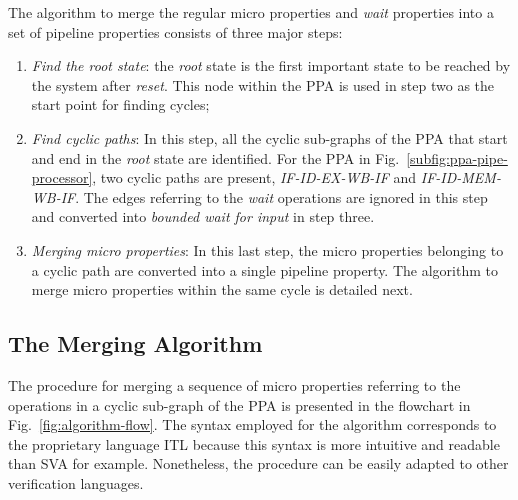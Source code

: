 The algorithm to merge the regular micro properties and \textit{wait} properties into a set of pipeline properties consists of three major steps:

\begin{enumerate}
\item \textit{Find the root state}: the \textit{root} state is the first important state to be reached by the system after \textit{reset}. This node within the PPA is used in step two as the start point for finding cycles;
\item \textit{Find cyclic paths}: In this step, all the cyclic sub-graphs of the PPA that start and end in the \textit{root} state are identified. For the PPA in Fig.~\ref{subfig:ppa-pipe-processor}, two cyclic paths are present, \textit{IF-ID-EX-WB-IF} and \textit{IF-ID-MEM-WB-IF}. The edges referring to the \textit{wait} operations are ignored in this step and converted into \textit{bounded wait for input} in step three.
\item \textit{Merging micro properties}: In this last step, the micro properties belonging to a cyclic path are converted into a single pipeline property. The algorithm to merge micro properties within the same cycle is detailed next. 
\end{enumerate}

\subsection*{The Merging Algorithm}

The procedure for merging a sequence of micro properties referring to the operations in a cyclic sub-graph of the PPA is presented in the flowchart in Fig.~\ref{fig:algorithm-flow}. The syntax employed for the algorithm corresponds to the proprietary language ITL \cite{onespin} because this syntax is more intuitive and readable than SVA for example. Nonetheless, the procedure can be easily adapted to other verification languages. 

